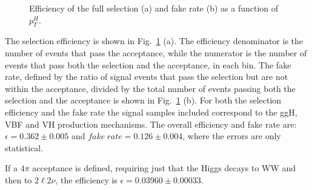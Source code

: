 \begin{figure}[t]
\centering
{}
\caption{Efficiency of the full selection (a) and fake rate (b) as a function of $p_T^H$.\label{fig:sel_eff}}
\end{figure}

The selection efficiency is shown in Fig.~\ref{fig:sel_eff} (a). The efficiency denominator is the number of events that pass the acceptance, while the numerator is the number of events that pass both the selection and the acceptance, in each \pth bin. The fake rate, defined by the ratio of signal events that pass the selection but are not within the acceptance, divided by the total number of events passing both the selection and the acceptance is shown in Fig.~\ref{fig:sel_eff} (b). For both the selection efficiency and the fake rate the signal samples included correspond to the ggH, VBF and VH production mechanisms.
The overall efficiency and fake rate are: $\epsilon=0.362\pm{0.005}$ and $fake~rate=0.126\pm0.004$, where the errors are only statistical.

If a $4\pi$ acceptance is defined, requiring just that the Higgs decays to WW and then to $2\ell2\nu$, the efficiency is $\epsilon=0.03960\pm{0.00033}$. 

